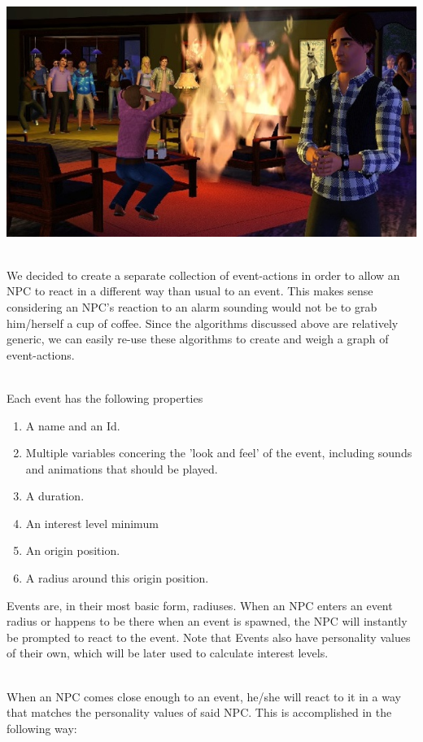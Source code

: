\documentclass[11pt]{article} %
\begin{document}
~\\
\includegraphics[scale=0.7]{SimsFire2}

~\\
We decided to create a separate collection of event-actions in order to allow an NPC to react in a different way than usual to an event. This makes sense considering an NPC's reaction to an alarm sounding would not be to grab him/herself a cup of coffee.
Since the algorithms discussed above are relatively generic, we can easily re-use these algorithms to create and weigh a graph of event-actions. 

~\\
Each event has the following properties 

\begin{enumerate}
\item A name and an Id.
\item Multiple variables concering the 'look and feel' of the event, including sounds and animations that should be played.
\item A duration.
\item An interest level minimum
\item An origin position.
\item A radius around this origin position.
\end{enumerate}

\newpage
Events are, in their most basic form, radiuses. When an NPC enters an event radius or happens to be there when an event is spawned, the NPC will instantly be prompted to react to the event.
Note that Events also have personality values of their own, which will be later used to calculate interest levels.

~\\
When an NPC comes close enough to an event, he/she will react to it in a way that matches the personality values of said NPC. This is accomplished in the following way:
\end{document}
